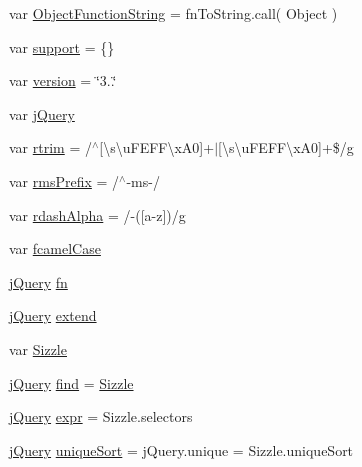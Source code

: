\begin{DoxyCompactItemize}
\item 
var \hyperlink{jquery-3_82_81_8js_ad79aeb65b48e6765b43abcec785d570d}{Object\+Function\+String} = fn\+To\+String.\+call( Object )
\item 
var \hyperlink{jquery-3_82_81_8js_ab166c89ccabddfd7c423a7fcb23ca84f}{support} = \{\}
\item 
var \hyperlink{jquery-3_82_81_8js_a614229fff4211edebc3c193d1e7763ec}{version} = \char`\"{}3..\char`\"{}
\item 
var \hyperlink{jquery-3_82_81_8js_a609525712f1102566c2b03866ceb2bba}{j\+Query}
\item 
var \hyperlink{jquery-3_82_81_8js_a4a6734f7bc3f896785855b829a1d5d9e}{rtrim} = /$^\wedge$\mbox{[}\textbackslash{}s\textbackslash{}u\+F\+E\+F\+F\textbackslash{}x\+A0\mbox{]}+$\vert$\mbox{[}\textbackslash{}s\textbackslash{}u\+F\+E\+F\+F\textbackslash{}x\+A0\mbox{]}+\$/g
\item 
var \hyperlink{jquery-3_82_81_8js_a3af3b994ecb718c298667ea5c52dfdbe}{rms\+Prefix} = /$^\wedge$-\/ms-\//
\item 
var \hyperlink{jquery-3_82_81_8js_a2d9c4c70bc32618862e2f587133cc6a6}{rdash\+Alpha} = /-\/(\mbox{[}a-\/z\mbox{]})/g
\item 
var \hyperlink{jquery-3_82_81_8js_a557c2142f8ded6728ea9eb2736b16cd8}{fcamel\+Case}
\item 
\hyperlink{jquery-3_82_81_8js_a609525712f1102566c2b03866ceb2bba}{j\+Query} \hyperlink{jquery-3_82_81_8js_acef6bdaf6b9b20fdcca1ea86f0902c3b}{fn}
\item 
\hyperlink{jquery-3_82_81_8js_a609525712f1102566c2b03866ceb2bba}{j\+Query} \hyperlink{jquery-3_82_81_8js_aac35e191adb9b382ad4244530e4e1b3d}{extend}
\item 
var \hyperlink{jquery-3_82_81_8js_ad64f9ab8a505a539fba7865107a51874}{Sizzle}
\item 
\hyperlink{jquery-3_82_81_8js_a609525712f1102566c2b03866ceb2bba}{j\+Query} \hyperlink{jquery-3_82_81_8js_a55fc855d7b79b5914e96c09c3d1e2651}{find} = \hyperlink{jquery-3_82_81_8js_ad64f9ab8a505a539fba7865107a51874}{Sizzle}
\item 
\hyperlink{jquery-3_82_81_8js_a609525712f1102566c2b03866ceb2bba}{j\+Query} \hyperlink{jquery-3_82_81_8js_aaacd1d5b3593ba4dfff6d67d4f6cfda1}{expr} = Sizzle.\+selectors
\item 
\hyperlink{jquery-3_82_81_8js_a609525712f1102566c2b03866ceb2bba}{j\+Query} \hyperlink{jquery-3_82_81_8js_a383941016706dad5908034f607fa32c8}{unique\+Sort} = j\+Query.\+unique = Sizzle.\+unique\+Sort
\item 

\end{DoxyCompactItemize}
